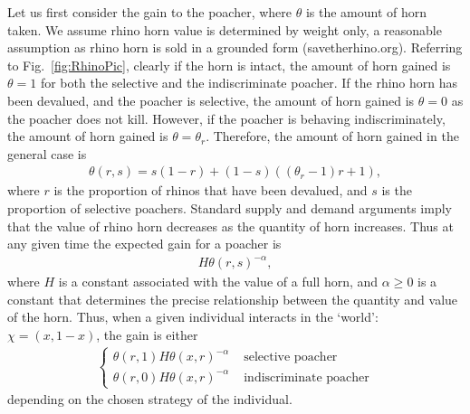 \documentclass[10pt]{article}
\begin{document}
Let us first consider the gain to the poacher, where $\theta$ is the amount of horn taken. We assume rhino horn value is determined by weight only, a reasonable assumption as rhino horn is sold in a grounded form (savetherhino.org). Referring to Fig.~\ref{fig:RhinoPic}, clearly if the horn is intact, the amount of horn gained is $\theta=1$ for both the selective and the indiscriminate poacher. If the rhino horn has been devalued, and the poacher is selective, the amount of horn gained is $\theta=0$ as the poacher does not kill. However, if the poacher is behaving indiscriminately, the amount of horn gained is $\theta = \theta_r$. Therefore, the amount of horn gained in the general case is
\begin{eqnarray}
\label{eqn:theta}
\theta(r,s) = s(1-r) + (1-s)((\theta_r -1)r + 1),
\end{eqnarray}
where $r$ is the proportion of rhinos that have been devalued, and $s$ is the proportion of selective poachers. Standard supply and demand arguments imply that the value of rhino horn decreases as the quantity of horn increases. Thus at any given time the expected gain for a poacher is
\begin{eqnarray}
\label{eqn:world_gain}
H \theta(r,s)^{-\alpha},
\end{eqnarray}
where $H$ is a constant associated with the value of a full horn, and $ \alpha
\geq 0$ is a constant that determines the precise relationship between the
quantity and value of the horn. Thus, when a given individual interacts in the
`world': \(\chi=(x, 1-x)\), the gain is either
\begin{eqnarray}
\label{eqn:gain}
\left\{
\begin{array}{cl}
\theta(r,1) H \theta(x,r)^{-\alpha} & \mbox{ selective poacher}
\\
\theta(r,0) H \theta(x,r)^{-\alpha} & \mbox{ indiscriminate poacher}
\end{array} \right.
\end{eqnarray}
depending on the chosen strategy of the individual.
\end{document}
